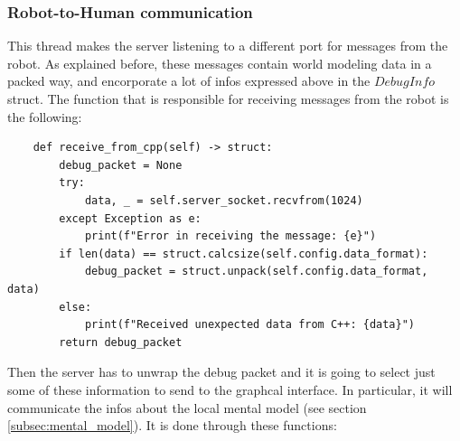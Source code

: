 \documentclass[a4paper, onecolumn, 12pt]{article}
\begin{document}
\subsubsection{Robot-to-Human communication}
This thread makes the server listening to a different port for messages from the 
robot. As explained before, these messages contain world modeling data in
a packed way, and encorporate a lot of infos expressed above in the $DebugInfo$ struct.
The function that is responsible for receiving messages from the robot is the following:
\begin{verbatim}
    def receive_from_cpp(self) -> struct:
        debug_packet = None
        try:    
            data, _ = self.server_socket.recvfrom(1024)
        except Exception as e:
            print(f"Error in receiving the message: {e}")
        if len(data) == struct.calcsize(self.config.data_format):
            debug_packet = struct.unpack(self.config.data_format, data)
        else:
            print(f"Received unexpected data from C++: {data}")
        return debug_packet
\end{verbatim}

Then the server has to unwrap the debug packet and it is going to select just some of these information
to send to the graphcal interface. In particular, it will communicate the infos about the 
local mental model (see section \ref{subsec:mental_model}). It is done through these functions:
\end{document}
